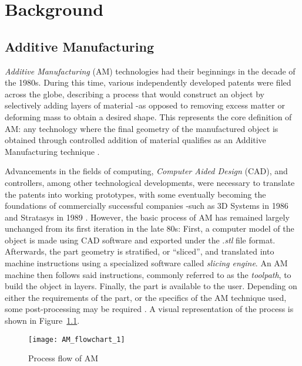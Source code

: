 \documentclass[main.tex]{subfiles}
\begin{document}
\chapter{Background}
\section{Additive Manufacturing}\label{sec:AM} %
\emph{Additive Manufacturing} (AM) technologies had their beginnings in the decade of the 1980s. During this time, various independently developed patents were filed across the globe, describing a process that would construct an object by selectively adding layers of material -as opposed to removing excess matter or deforming mass to obtain a desired shape. This represents the core definition of AM: any technology where the final geometry of the manufactured object is obtained through controlled addition of material qualifies as an Additive Manufacturing technique \cite{Gibson2015}.

Advancements in the fields of computing, \emph{Computer Aided Design} (CAD), and controllers, among other technological developments, were necessary to translate the patents into working prototypes, with some eventually becoming the foundations of commercially successful companies -such as 3D Systems in 1986 and Stratasys in 1989 \cite{Gibson2015,3DSystems,Stratasys2017}. However, the basic process of AM has remained largely unchanged from its first iteration in the late 80s: First, a computer model of the object is made using CAD software and exported under the .\emph{stl} file format. Afterwards, the part geometry is stratified, or \textquotedblleft sliced\textquotedblright, and translated into machine instructions using a specialized software called \emph{slicing engine}. An AM machine then follows said instructions, commonly referred to as the \emph{toolpath}, to build the object in layers. Finally, the part is available to the user. Depending on either the requirements of the part, or the specifics of the AM technique used, some post-processing may be required \cite{Gibson2015}. A visual representation of the process is shown in Figure~\ref{fig:AM_flow}.

\begin{figure}[h]
	\center
	\texttt{[image: AM\_flowchart\_1]}
	\caption{Process flow of AM} \label{fig:AM_flow}
\end{figure}
\pagebreak %
 
\end{document}
